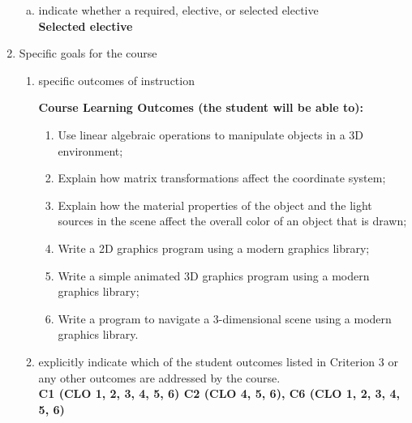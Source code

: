 \begin{enumerate}[1.]
\begin{enumerate}[a.]
\item indicate whether a required, elective, or selected elective\\ %
  {\bfseries
    Selected elective
  }

\end{enumerate}

\item Specific goals for the course
\begin{enumerate}
\item specific outcomes of instruction\\ %
  {\bfseries
    Course Learning Outcomes (the student will be able to):
\begin{enumerate}[1.]
\item Use linear algebraic operations to manipulate objects in a 3D environment;
\item Explain how matrix transformations affect the coordinate system;          
\item  Explain how the material properties of the object and the light
  sources in the scene affect the overall color of an object that is drawn;
\item Write a 2D graphics program using a modern graphics library;
\item Write a simple animated 3D graphics program using a modern graphics library;
\item Write a program to navigate a 3-dimensional scene using a modern graphics library.
\end{enumerate}
  }

\item explicitly indicate which of the student outcomes listed in Criterion 3 or any other outcomes are addressed by the course.\\
  {\bfseries
    C1 (CLO 1, 2, 3, 4, 5, 6)
    C2 (CLO 4, 5, 6),
    C6 (CLO 1, 2, 3, 4, 5, 6)
  }
\end{enumerate}


\end{enumerate}
